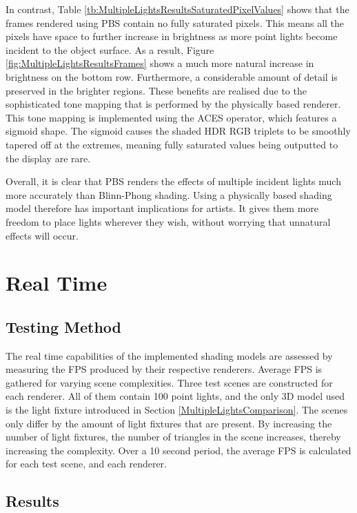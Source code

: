In contrast, Table \ref{tb:MultipleLightsResultsSaturatedPixelValues} shows that the frames rendered using PBS contain no fully saturated pixels. This means all the pixels have space to further increase in brightness as more point lights become incident to the object surface. As a result, Figure \ref{fig:MultipleLightsResultsFrames} shows a much more natural increase in brightness on the bottom row. Furthermore, a considerable amount of detail is preserved in the brighter regions. These benefits are realised due to the sophisticated tone mapping that is performed by the physically based renderer. This tone mapping is implemented using the ACES operator, which features a sigmoid shape. The sigmoid causes the shaded HDR RGB triplets to be smoothly tapered off at the extremes, meaning fully saturated values being outputted to the display are rare.

Overall, it is clear that PBS renders the effects of multiple incident lights much more accurately than Blinn-Phong shading. Using a physically based shading model therefore has important implications for artists. It gives them more freedom to place lights wherever they wish, without worrying that unnatural effects will occur.

\section{Real Time}

\subsection{Testing Method}

The real time capabilities of the implemented shading models are assessed by measuring the FPS produced by their respective renderers. Average FPS is gathered for varying scene complexities. Three test scenes are constructed for each renderer. All of them contain 100 point lights, and the only 3D model used is the light fixture introduced in Section \ref{MultipleLightsComparison}. The scenes only differ by the amount of light fixtures that are present. By increasing the number of light fixtures, the number of triangles in the scene increases, thereby increasing the complexity. Over a 10 second period, the average FPS is calculated for each test scene, and each renderer.

\subsection{Results}


